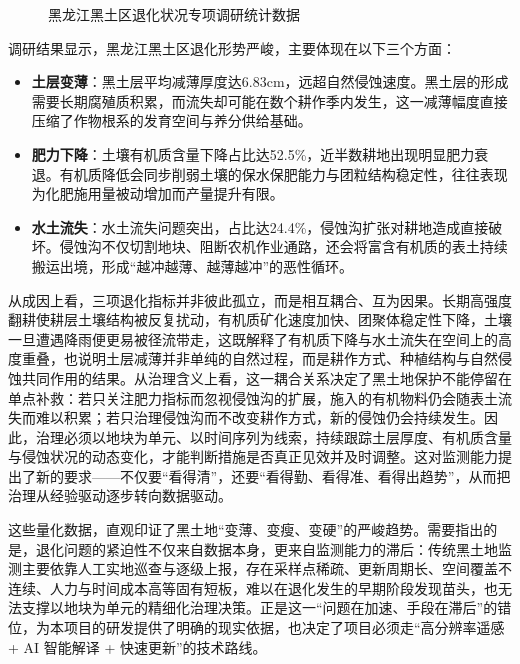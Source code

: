 \documentclass[12pt, a4paper]{ctexart}
\begin{document}
\begin{figure}[htbp]
    \centering
    \caption{黑龙江黑土区退化状况专项调研统计数据}
    \label{fig:img2}
\end{figure}

调研结果显示，黑龙江黑土区退化形势严峻，主要体现在以下三个方面：

\begin{itemize}
    \item \textbf{土层变薄}：黑土层平均减薄厚度达6.83cm，远超自然侵蚀速度。黑土层的形成需要长期腐殖质积累，而流失却可能在数个耕作季内发生，这一减薄幅度直接压缩了作物根系的发育空间与养分供给基础。
    \item \textbf{肥力下降}：土壤有机质含量下降占比达52.5\%，近半数耕地出现明显肥力衰退。有机质降低会同步削弱土壤的保水保肥能力与团粒结构稳定性，往往表现为化肥施用量被动增加而产量提升有限。
    \item \textbf{水土流失}：水土流失问题突出，占比达24.4\%，侵蚀沟扩张对耕地造成直接破坏。侵蚀沟不仅切割地块、阻断农机作业通路，还会将富含有机质的表土持续搬运出境，形成“越冲越薄、越薄越冲”的恶性循环。
\end{itemize}

从成因上看，三项退化指标并非彼此孤立，而是相互耦合、互为因果。长期高强度翻耕使耕层土壤结构被反复扰动，有机质矿化速度加快、团聚体稳定性下降，土壤一旦遭遇降雨便更易被径流带走，这既解释了有机质下降与水土流失在空间上的高度重叠，也说明土层减薄并非单纯的自然过程，而是耕作方式、种植结构与自然侵蚀共同作用的结果。从治理含义上看，这一耦合关系决定了黑土地保护不能停留在单点补救：若只关注肥力指标而忽视侵蚀沟的扩展，施入的有机物料仍会随表土流失而难以积累；若只治理侵蚀沟而不改变耕作方式，新的侵蚀仍会持续发生。因此，治理必须以地块为单元、以时间序列为线索，持续跟踪土层厚度、有机质含量与侵蚀状况的动态变化，才能判断措施是否真正见效并及时调整。这对监测能力提出了新的要求——不仅要“看得清”，还要“看得勤、看得准、看得出趋势”，从而把治理从经验驱动逐步转向数据驱动。

这些量化数据，直观印证了黑土地“变薄、变瘦、变硬”的严峻趋势。需要指出的是，退化问题的紧迫性不仅来自数据本身，更来自监测能力的滞后：传统黑土地监测主要依靠人工实地巡查与逐级上报，存在采样点稀疏、更新周期长、空间覆盖不连续、人力与时间成本高等固有短板，难以在退化发生的早期阶段发现苗头，也无法支撑以地块为单元的精细化治理决策。正是这一“问题在加速、手段在滞后”的错位，为本项目的研发提供了明确的现实依据，也决定了项目必须走“高分辨率遥感 + AI 智能解译 + 快速更新”的技术路线。
\end{document}
